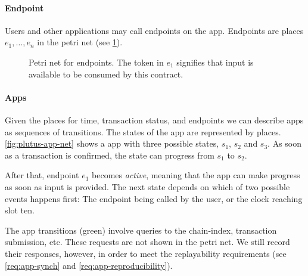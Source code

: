 \paragraph{Endpoint}

Users and other applications may call endpoints on the \gls{app}.
Endpoints are places $e_1, \ldots, e_n$ in the petri net (see \ref{fig:petri-net-endpoint}).

\begin{figure}
  \centering
\caption{Petri net for endpoints. The token in $e_1$ signifies that input is available to be consumed by this contract.}
\label{fig:petri-net-endpoint}
\end{figure}

\paragraph{Apps}

Given the places for time, transaction status, and endpoints we can describe \glspl{app} as sequences of transitions.
The states of the app are represented by places.
\ref{fig:plutus-app-net} shows a \gls{app} with three possible states, $s_1$, $s_2$ and $s_3$.
As soon as a transaction is confirmed, the state can progress from $s_1$ to $s_2$.

After that, endpoint $e_1$ becomes \emph{active}, meaning that the app can make progress as soon as input is provided. The next state depends on which of two possible events happens first: The endpoint being called by the user, or the clock reaching slot ten.

The app transitions (green) involve queries to the \gls{chain-index}, transaction submission, etc.
These requests are not shown in the petri net.
We still record their responses, however, in order to meet the replayability requirements (see \ref{req:app-synch} and \ref{req:app-reproducibility}).

